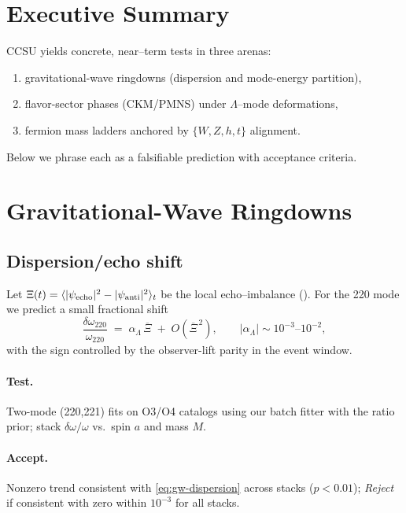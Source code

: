 

\section*{Executive Summary}
CCSU yields concrete, near–term tests in three arenas:
\begin{enumerate}[nosep]
  \item gravitational-wave ringdowns (dispersion and mode-energy partition),
  \item flavor-sector phases (CKM/PMNS) under \(\Lambda\)--mode deformations,
  \item fermion mass ladders anchored by \(\{W,Z,h,t\}\) alignment.
\end{enumerate}
Below we phrase each as a falsifiable prediction with acceptance criteria.

\section{Gravitational-Wave Ringdowns}

\subsection{Dispersion/echo shift}
Let \(\Xi(t)=\langle|\psi_{\rm echo}|^2-|\psi_{\rm anti}|^2\rangle_t\) be the local echo–imbalance (\label{chap:gravity}). For the 220 mode we predict a small fractional shift
\begin{equation}
\frac{\delta\omega_{220}}{\omega_{220}}
\;=\;\alpha_\Lambda\,\overline{\Xi}\;+\;O\!\left(\overline{\Xi}^{\,2}\right),
\qquad |\alpha_\Lambda|\sim 10^{-3}\text{--}10^{-2},
\label{eq:gw-dispersion}
\end{equation}
with the sign controlled by the observer-lift parity in the event window.
\paragraph{Test.} Two-mode (220,221) fits on O3/O4 catalogs using our batch fitter with the ratio prior; stack \(\delta\omega/\omega\) vs.\ spin \(a\) and mass \(M\).
\paragraph{Accept.} Nonzero trend consistent with \eqref{eq:gw-dispersion} across stacks (\(p<0.01\)); \emph{Reject} if consistent with zero within \(10^{-3}\) for all stacks.


